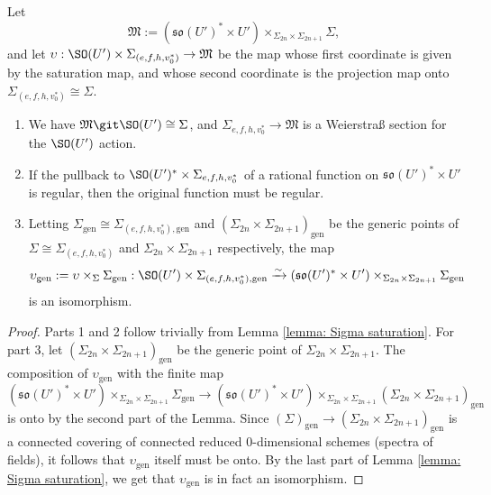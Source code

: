 \documentclass[11pt]{article}
\begin{document}
Let $$\mathfrak{M}:=(\mathfrak{so}(U')^*\times U')\times_{\Sigma_{2n}\times \Sigma_{2n+1}}\Sigma,$$
and let $\upsilon: \SO(U')\times \Sigma_{(e, f, h, v_0^*)}\to \mathfrak{M}$ be the map whose first coordinate is given by the saturation map, and whose second coordinate is the projection map onto $\Sigma_{(e, f, h, v_0^*)}\cong \Sigma$.
\begin{corollary}
    \begin{enumerate}[label=(\roman*), ref=\thecorollary(\roman*)]
        \item We have $\mathfrak{M}\git \SO(U')\cong \Sigma$, and $\Sigma_{e,f,h, v_0^*}\to \mathfrak{M}$ is a Weierstraß section for the $\SO(U')$ action.
        \item \label{cor-item: regularity can be checked on Sigma} If the pullback to $\SO(U')^*\times \Sigma_{e, f, h, v_0^*}$ of a rational function on $\mathfrak{so}(U')^*\times U'$ is regular, then the original function must be regular.
        \item \label{cor-item: upsilon gen} Letting $\Sigma_{\mathrm{gen}}\cong \Sigma_{(e, f, h, v_0^*),\mathrm{gen}}$ and $(\Sigma_{2n}\times \Sigma_{2n+1})_\mathrm{gen}$ be the generic points of $\Sigma\cong \Sigma_{(e, f, h, v_0^*)}$ and $\Sigma_{2n}\times \Sigma_{2n+1}$ respectively, the map $$\upsilon_{\mathrm{gen}}:=\upsilon\times_\Sigma \Sigma_\mathrm{gen}:\SO(U')\times \Sigma_{(e, f, h, v_0^*),\mathrm{gen}} \xrightarrow{\sim}(\mathfrak{so}(U')^*\times U')\times_{\Sigma_{2n}\times \Sigma_{2n+1}}\Sigma_{\mathrm{gen}}$$ is an isomorphism.
    \end{enumerate}
\end{corollary}
\begin{proof}
    Parts 1 and 2 follow trivially from Lemma \ref{lemma: Sigma saturation}.
    For part 3, let $(\Sigma_{2n}\times\Sigma_{2n+1})_\mathrm{gen}$ be the generic point of $\Sigma_{2n}\times\Sigma_{2n+1}$. The composition of $\upsilon_\mathrm{gen}$ with the finite map
    $$(\mathfrak{so}(U')^*\times U')\times_{\Sigma_{2n}\times \Sigma_{2n+1}}\Sigma_{\mathrm{gen}}\to (\mathfrak{so}(U')^*\times U')\times_{\Sigma_{2n}\times \Sigma_{2n+1}}(\Sigma_{2n}\times \Sigma_{2n+1})_\mathrm{gen}$$
    is onto by the second part of the Lemma.
    Since $(\Sigma)_\mathrm{gen}\to (\Sigma_{2n}\times \Sigma_{2n+1})_\mathrm{gen}$ is a connected covering of connected reduced 0-dimensional schemes (spectra of fields), it follows that $\upsilon_\mathrm{gen}$ itself must be onto. By the last part of Lemma \ref{lemma: Sigma saturation}, we get that $\upsilon_\mathrm{gen}$ is in fact an isomorphism.
\end{proof}
\end{document}
